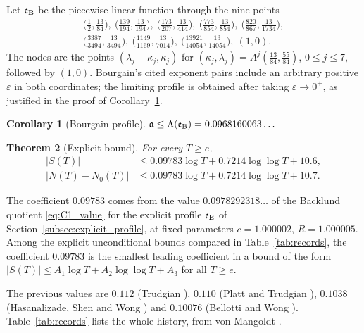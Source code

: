 \documentclass[11pt,a4paper]{article}
\makeatletter
\numberwithin{equation}{section}
\DeclareRobustCommand{\CGref}[1]{\ref{#1}}
\DeclareRobustCommand{\CGeqref}[1]{\eqref{#1}}
\DeclareRobustCommand{\CGcite}[2][]{\if\relax\detokenize{#1}\relax\cite{#2}\else\cite[#1]{#2}\fi}
\let\CG@origref\ref
\let\CG@origeqref\eqref
\newcommand{\CG@gettip}[1]{\@ifundefined{CGTip@#1}{#1}{\csname CGTip@#1\endcsname}}
\newcommand{\CG@getbib}[1]{\@ifundefined{CGBib@#1}{#1}{\csname CGBib@#1\endcsname}}
\DeclareRobustCommand{\CGref}[1]{\pdftooltip{\CG@origref{#1}}{\CG@gettip{#1}}}
\DeclareRobustCommand{\CGeqref}[1]{\pdftooltip{\CG@origeqref{#1}}{\CG@gettip{#1}}}
\DeclareRobustCommand{\CGcite}[2][]{\pdftooltip{\if\relax\detokenize{#1}\relax\cite{#2}\else\cite[#1]{#2}\fi}{\CG@getbib{#2}}}
\newtheorem{theorem}{Theorem}[section]
\newtheorem{corollary}[theorem]{Corollary}
\theoremstyle{definition}
\theoremstyle{remark}
\newcommand{\Nz}{N_0} %
\newcommand{\eB}{\mathfrak e_{\rm B}}
\newcommand{\eE}{\mathfrak e_{\rm E}}
\makeatother
\begin{document}
Let $\eB$ be the piecewise linear function through the nine points
\begin{equation}
\begin{gathered}
\bigl(\tfrac12,\tfrac{13}{84}\bigr),\ \bigl(\tfrac{139}{194},\tfrac{13}{194}\bigr),\ \bigl(\tfrac{173}{207},\tfrac{13}{414}\bigr),\ \bigl(\tfrac{773}{854},\tfrac{13}{854}\bigr),\ \bigl(\tfrac{820}{867},\tfrac{13}{1734}\bigr),\\ \bigl(\tfrac{3387}{3494},\tfrac{13}{3494}\bigr),\ \bigl(\tfrac{1149}{1169},\tfrac{13}{7014}\bigr),\ \bigl(\tfrac{13921}{14054},\tfrac{13}{14054}\bigr),\ (1,0).
\end{gathered}
\label{eq:bourgain_nodes}
\end{equation}
The nodes are the points $(\lambda_j-\kappa_j,\kappa_j)$ for $(\kappa_j,\lambda_j)=A^j(\frac{13}{84},\frac{55}{84})$, $0\le j\le7$, followed by $(1,0)$. Bourgain's cited exponent pairs include an arbitrary positive $\varepsilon$ in both coordinates; the limiting profile is obtained after taking $\varepsilon\to0^+$, as justified in the proof of Corollary~\CGref{cor:bourgain}.

\begin{corollary}[Bourgain profile]\label{cor:bourgain}
$\displaystyle \mathfrak a\le\Lambda(\eB)=0.0968160063\ldots$
\end{corollary}

\begin{theorem}[Explicit bound]\label{thm:explicit}
For every $T\ge e$,
\begin{align}
|S(T)|&\le0.09783\log T+0.7214\log\log T+10.6,\label{eq:explicit_S}\\
\bigl|N(T)-\Nz(T)\bigr|&\le0.09783\log T+0.7214\log\log T+10.7.\label{eq:explicit_N}
\end{align}
\end{theorem}

The coefficient $0.09783$ comes from the value $0.0978292318\ldots$ of the Backlund quotient \CGeqref{eq:C1_value} for the explicit profile $\eE$ of Section~\CGref{subsec:explicit_profile}, at fixed parameters $c=1.000002$, $R=1.000005$. Among the explicit unconditional bounds compared in Table~\CGref{tab:records}, the coefficient $0.09783$ is the smallest leading coefficient in a bound of the form $|S(T)|\le A_1\log T+A_2\log\log T+A_3$ for all $T\ge e$.

The previous values are $0.112$ (Trudgian \CGcite{Trudgian2014}), $0.110$ (Platt and Trudgian \CGcite{PlattTrudgian2015}), $0.1038$ (Hasanalizade, Shen and Wong \CGcite{HasanalizadeShenWong2022}) and $0.10076$ (Bellotti and Wong \CGcite{BellottiWong2025}). Table~\CGref{tab:records} lists the whole history, from von Mangoldt \CGcite{VonMangoldt1905}.
\end{document}
